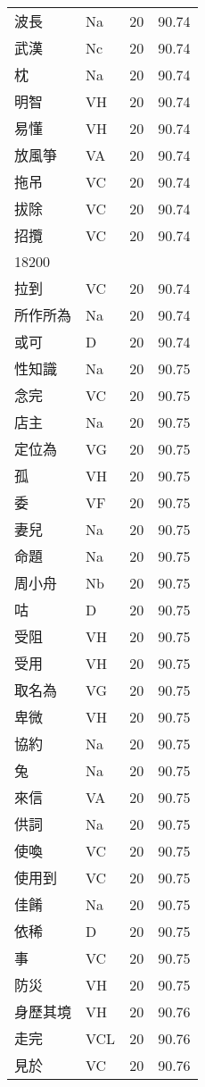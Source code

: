 \documentclass[twocolumn]{book}
\begin{document}
\begin{supertabular}{llrr}
波長 & Na & 20 &  90.74\\
武漢 & Nc & 20 &  90.74\\
枕 & Na & 20 &  90.74\\
明智 & VH & 20 &  90.74\\
易懂 & VH & 20 &  90.74\\
放風箏 & VA & 20 &  90.74\\
拖吊 & VC & 20 &  90.74\\
拔除 & VC & 20 &  90.74\\
招攬 & VC & 20 &  90.74\\
18200\\
拉到 & VC & 20 &  90.74\\
所作所為 & Na & 20 &  90.74\\
或可 & D & 20 &  90.74\\
性知識 & Na & 20 &  90.75\\
念完 & VC & 20 &  90.75\\
店主 & Na & 20 &  90.75\\
定位為 & VG & 20 &  90.75\\
孤 & VH & 20 &  90.75\\
委 & VF & 20 &  90.75\\
妻兒 & Na & 20 &  90.75\\
命題 & Na & 20 &  90.75\\
周小舟 & Nb & 20 &  90.75\\
咕 & D & 20 &  90.75\\
受阻 & VH & 20 &  90.75\\
受用 & VH & 20 &  90.75\\
取名為 & VG & 20 &  90.75\\
卑微 & VH & 20 &  90.75\\
協約 & Na & 20 &  90.75\\
兔 & Na & 20 &  90.75\\
來信 & VA & 20 &  90.75\\
供詞 & Na & 20 &  90.75\\
使喚 & VC & 20 &  90.75\\
使用到 & VC & 20 &  90.75\\
佳餚 & Na & 20 &  90.75\\
依稀 & D & 20 &  90.75\\
事 & VC & 20 &  90.75\\
防災 & VH & 20 &  90.75\\
身歷其境 & VH & 20 &  90.76\\
走完 & VCL & 20 &  90.76\\
見於 & VC & 20 &  90.76\\

\end{supertabular}
\end{document}

